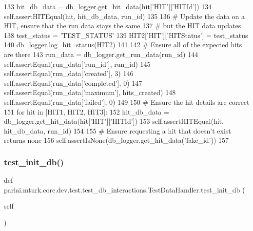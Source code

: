 \begin{DoxyCode}
133             hit\_db\_data = db\_logger.get\_hit\_data(hit[\textcolor{stringliteral}{'HIT'}][\textcolor{stringliteral}{'HITId'}])
134             self.assertHITEqual(hit, hit\_db\_data, run\_id)
135 
136         \textcolor{comment}{# Update the data on a HIT, ensure that the run data stays the same}
137         \textcolor{comment}{# but the HIT data updates}
138         test\_status = \textcolor{stringliteral}{'TEST\_STATUS'}
139         HIT2[\textcolor{stringliteral}{'HIT'}][\textcolor{stringliteral}{'HITStatus'}] = test\_status
140         db\_logger.log\_hit\_status(HIT2)
141 
142         \textcolor{comment}{# Ensure all of the expected hits are there}
143         run\_data = db\_logger.get\_run\_data(run\_id)
144         self.assertEqual(run\_data[\textcolor{stringliteral}{'run\_id'}], run\_id)
145         self.assertEqual(run\_data[\textcolor{stringliteral}{'created'}], 3)
146         self.assertEqual(run\_data[\textcolor{stringliteral}{'completed'}], 0)
147         self.assertEqual(run\_data[\textcolor{stringliteral}{'maximum'}], hits\_created)
148         self.assertEqual(run\_data[\textcolor{stringliteral}{'failed'}], 0)
149 
150         \textcolor{comment}{# Ensure the hit details are correct}
151         \textcolor{keywordflow}{for} hit \textcolor{keywordflow}{in} [HIT1, HIT2, HIT3]:
152             hit\_db\_data = db\_logger.get\_hit\_data(hit[\textcolor{stringliteral}{'HIT'}][\textcolor{stringliteral}{'HITId'}])
153             self.assertHITEqual(hit, hit\_db\_data, run\_id)
154 
155         \textcolor{comment}{# Ensure requesting a hit that doesn't exist returns none}
156         self.assertIsNone(db\_logger.get\_hit\_data(\textcolor{stringliteral}{'fake\_id'}))
157 
\end{DoxyCode}
\mbox{\label{classparlai_1_1mturk_1_1core_1_1dev_1_1test_1_1test__db__interactions_1_1TestDataHandler_a603412b42f5d14e3d2f488d392942f15}} 
\subsubsection{\texorpdfstring{test\+\_\+init\+\_\+db()}{test\_init\_db()}}
{\footnotesize\ttfamily def parlai.\+mturk.\+core.\+dev.\+test.\+test\+\_\+db\+\_\+interactions.\+Test\+Data\+Handler.\+test\+\_\+init\+\_\+db (\begin{DoxyParamCaption}\item[{}]{self }\end{DoxyParamCaption})}



